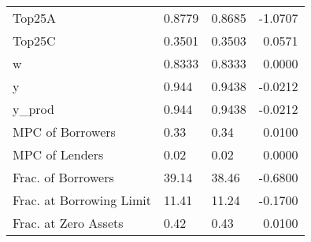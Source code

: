 \begin{table}
\begin{tabular}{lllr}
                  Top25A &  0.8779 &   0.8685 & -1.0707 \\
                  Top25C &  0.3501 &   0.3503 &  0.0571 \\
                       w &  0.8333 &   0.8333 &  0.0000 \\
                       y &   0.944 &   0.9438 & -0.0212 \\
                  y\_prod &   0.944 &   0.9438 & -0.0212 \\
        MPC of Borrowers &    0.33 &     0.34 &  0.0100 \\
          MPC of Lenders &    0.02 &     0.02 &  0.0000 \\
      Frac. of Borrowers &   39.14 &    38.46 & -0.6800 \\
Frac. at Borrowing Limit &   11.41 &    11.24 & -0.1700 \\
    Frac. at Zero Assets &    0.42 &     0.43 &  0.0100 \\
\bottomrule
\end{tabular}
\end{table}

